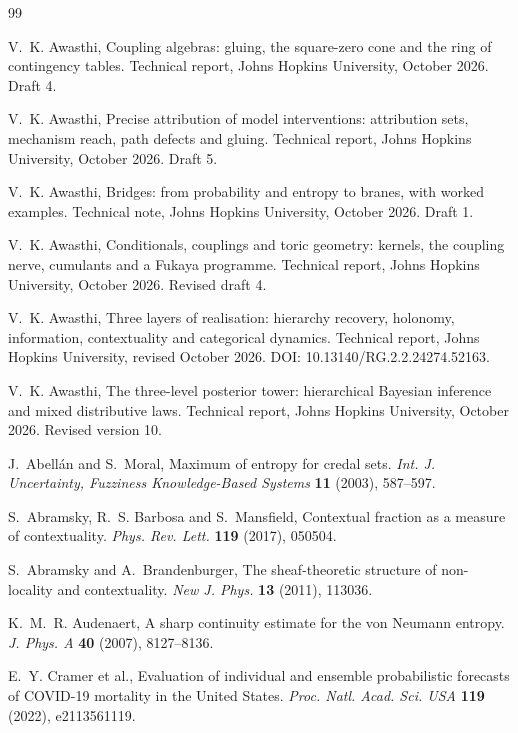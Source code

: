 \documentclass[11pt]{article}
\theoremstyle{definition}
\theoremstyle{remark}
\begin{document}
\begin{thebibliography}{99}

V.~K. Awasthi, Coupling algebras: gluing, the square-zero cone and the ring of contingency tables. Technical report, Johns
Hopkins University, October 2026. Draft 4.

V.~K. Awasthi, Precise attribution of model interventions: attribution sets, mechanism reach, path defects and gluing.
Technical report, Johns Hopkins University, October 2026. Draft 5.

V.~K. Awasthi, Bridges: from probability and entropy to branes, with worked examples. Technical note, Johns Hopkins University,
October 2026. Draft 1.

V.~K. Awasthi, Conditionals, couplings and toric geometry: kernels, the coupling nerve, cumulants and a {F}ukaya
programme. Technical report, Johns Hopkins University, October 2026. Revised draft 4.

V.~K. Awasthi, Three layers of realisation: hierarchy recovery, holonomy, information, contextuality and categorical
dynamics. Technical report, Johns Hopkins University, revised October 2026. DOI: 10.13140/RG.2.2.24274.52163.

V.~K. Awasthi, The three-level posterior tower: hierarchical {B}ayesian inference and mixed distributive laws.
Technical report, Johns Hopkins University, October 2026. Revised version 10.

J.~Abellán and S.~Moral, Maximum of entropy for credal sets. \emph{Int. J. Uncertainty, Fuzziness Knowledge-Based Systems}
\textbf{11} (2003), 587--597.

S.~Abramsky, R.~S. Barbosa and S.~Mansfield, Contextual fraction as a measure of contextuality. \emph{Phys. Rev. Lett.}
\textbf{119} (2017), 050504.

S.~Abramsky and A.~Brandenburger, The sheaf-theoretic structure of non-locality and contextuality. \emph{New J. Phys.} \textbf{13}
(2011), 113036.

K.~M.~R. Audenaert, A sharp continuity estimate for the von {N}eumann entropy. \emph{J. Phys. A} \textbf{40} (2007), 8127--8136.

E.~Y. Cramer et al., Evaluation of individual and ensemble probabilistic forecasts of {COVID}-19 mortality in the {U}nited
{S}tates. \emph{Proc. Natl. Acad. Sci. USA} \textbf{119} (2022), e2113561119.


\end{thebibliography}
\end{document}
